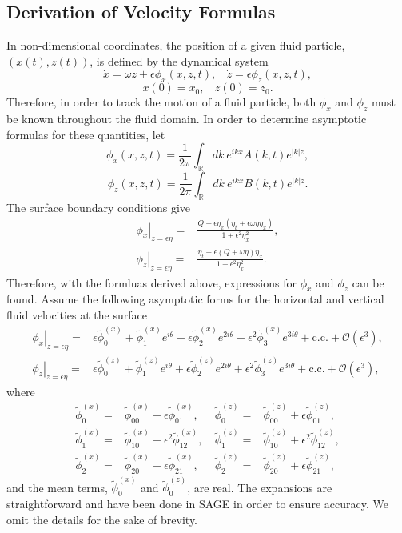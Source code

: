 \documentclass[a4paper,11pt]{article}
\begin{document}
\subsection{Derivation of Velocity Formulas}
In non-dimensional coordinates, the position of a given fluid particle, $(x(t),z(t))$, is defined by the dynamical system 
\[
\dot{x} = \omega z + \epsilon \phi_{x}(x,z,t), ~~~~ \dot{z} = \epsilon\phi_{z}(x,z,t),
\]
\[
x(0)=x_0,~~~~ z(0)=z_0.
\]
Therefore, in order to track the motion of a fluid particle, both $\phi_x$ and $\phi_z$ must be known throughout the fluid domain.  In order to determine asymptotic formulas for these quantities, let
\begin{equation}
\phi_{x}(x,z,t) = \frac{1}{2\pi}\int_{\mathbb{R}}dk~ e^{ikx} A(k,t)e^{|k|z},
\label{phix}
\end{equation}
\begin{equation}
\phi_{z}(x,z,t) = \frac{1}{2\pi}\int_{\mathbb{R}}dk~ e^{ikx} B(k,t)e^{|k|z}.
\label{phiz}
\end{equation}
The surface boundary conditions give
\begin{align*}
\left.\phi_{x}\right|_{z=\epsilon\eta} = & \frac{Q-\epsilon\eta_{x}(\eta_{t}+\epsilon\omega\eta\eta_{x})}{1+\epsilon^{2}\eta_{x}^{2}},\\
\left.\phi_{z}\right|_{z=\epsilon\eta} = & \frac{\eta_{t}+\epsilon \left(Q+\omega\eta\right)\eta_{x}}{1+\epsilon^{2}\eta_{x}^{2}}.
\end{align*}
Therefore, with the formluas derived above, expressions for $\phi_x$ and $\phi_z$ can be found.  Assume the following asymptotic forms for the horizontal and vertical fluid velocities at the surface
\begin{align*}
\left.\phi_{x}\right|_{z=\epsilon\eta} = & \epsilon\tilde{\phi}^{(x)}_{0} + \tilde{\phi}^{(x)}_{1}e^{i\theta} +  \epsilon\tilde{\phi}^{(x)}_{2}e^{2i\theta} + \epsilon^{2}\tilde{\phi}^{(x)}_{3}e^{3i\theta} + \mbox{c.c.} + \mathcal{O}(\epsilon^{3}),\\
\left.\phi_{z}\right|_{z=\epsilon\eta} = & \epsilon\tilde{\phi}^{(z)}_{0} + \tilde{\phi}^{(z)}_{1}e^{i\theta} +  \epsilon\tilde{\phi}^{(z)}_{2}e^{2i\theta} + \epsilon^{2}\tilde{\phi}^{(z)}_{3}e^{3i\theta} + \mbox{c.c.} + \mathcal{O}(\epsilon^{3}),
\end{align*}
where
\begin{align*}
\tilde{\phi}^{(x)}_{0} = & \tilde{\phi}^{(x)}_{00} + \epsilon \tilde{\phi}^{(x)}_{01}, & ~ \tilde{\phi}^{(z)}_{0} = & \tilde{\phi}^{(z)}_{00} + \epsilon \tilde{\phi}^{(z)}_{01},\\
\tilde{\phi}^{(x)}_{1} = & \tilde{\phi}^{(x)}_{10} + \epsilon^{2} \tilde{\phi}^{(x)}_{12}, & ~ \tilde{\phi}^{(z)}_{1} = & \tilde{\phi}^{(z)}_{10} + \epsilon^{2} \tilde{\phi}^{(z)}_{12},\\
\tilde{\phi}^{(x)}_{2} = & \tilde{\phi}^{(x)}_{20} + \epsilon \tilde{\phi}^{(x)}_{21}, & ~ \tilde{\phi}^{(z)}_{2} = & \tilde{\phi}^{(z)}_{20} + \epsilon \tilde{\phi}^{(z)}_{21},
\end{align*}
and the mean terms, $\tilde{\phi}^{(x)}_{0}$ and $\tilde{\phi}^{(z)}_{0}$, are real.  The expansions are straightforward and have been done in SAGE in order to ensure accuracy.  We omit the details for the sake of brevity.
\end{document}
